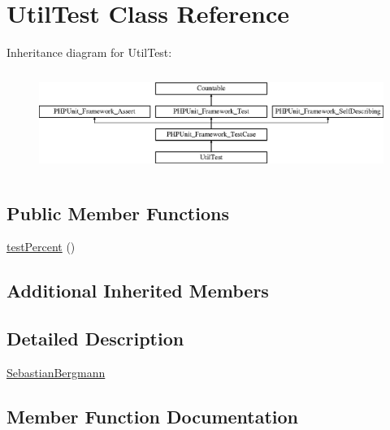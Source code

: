 \hypertarget{class_sebastian_bergmann_1_1_code_coverage_1_1_util_test}{}\section{Util\+Test Class Reference}
\label{class_sebastian_bergmann_1_1_code_coverage_1_1_util_test}
Inheritance diagram for Util\+Test\+:\begin{figure}[H]
\begin{center}
\leavevmode
\includegraphics[height=3.303835cm]{class_sebastian_bergmann_1_1_code_coverage_1_1_util_test}
\end{center}
\end{figure}
\subsection*{Public Member Functions}
\begin{DoxyCompactItemize}
\item 
\mbox{\hyperlink{class_sebastian_bergmann_1_1_code_coverage_1_1_util_test_a6e601cac2cefb2a987d2547886755f14}{test\+Percent}} ()
\end{DoxyCompactItemize}
\subsection*{Additional Inherited Members}


\subsection{Detailed Description}
\mbox{\hyperlink{namespace_sebastian_bergmann}{Sebastian\+Bergmann}} 

\subsection{Member Function Documentation}
\mbox{\label{class_sebastian_bergmann_1_1_code_coverage_1_1_util_test_a6e601cac2cefb2a987d2547886755f14}} 
